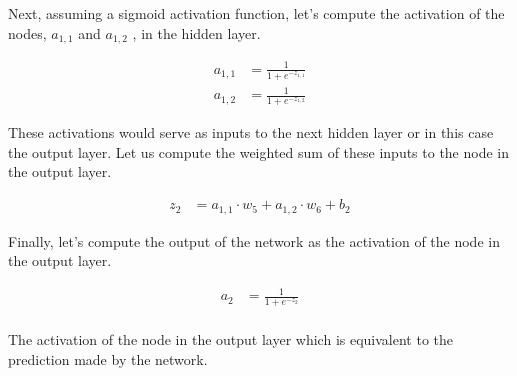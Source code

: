 \noindent Next, assuming a sigmoid activation function, let's compute the activation of the nodes,  $a_{1,1}$ and $a_{1,2}$ , in the hidden layer.

\begin{equation} \label{activation nodes}
	\begin{split}
		a_{1,1} & = \frac{1}{1+e^{-z_{1,1}}}\\
		a_{1,2} & = \frac{1}{1+e^{-z_{1,2}}}
	\end{split}
\end{equation}

\noindent These activations would serve as inputs to the next hidden layer or in this case the output layer. Let us compute the weighted sum of these inputs to the node in the output layer.

\begin{equation} \label{output layer}
	\begin{split}
		z_2 & = a_{1,1} \cdot w_5 + a_{1,2} \cdot w_6 + b_2
	\end{split}
\end{equation}

\noindent Finally, let's compute the output of the network as the activation of the node in the output layer.

\begin{equation} \label{output nodes}
	\begin{split}
		a_2 & = \frac{1}{1+e^{-z_2}}\\
	\end{split}
\end{equation}

\noindent The activation of the node in the output layer which is equivalent to the prediction made by the network.